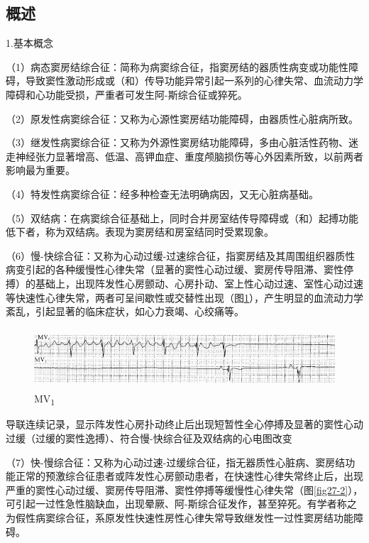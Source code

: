 \protect\hypertarget{text00034.htmlux5cux23subid409}{}{}

\subsection{概述}

1.基本概念

（1）病态窦房结综合征：简称为病窦综合征，指窦房结的器质性病变或功能性障碍，导致窦性激动形成或（和）传导功能异常引起一系列的心律失常、血流动力学障碍和心功能受损，严重者可发生阿-斯综合征或猝死。

（2）原发性病窦综合征：又称为心源性窦房结功能障碍，由器质性心脏病所致。

（3）继发性病窦综合征：又称为外源性窦房结功能障碍，多由心脏活性药物、迷走神经张力显著增高、低温、高钾血症、重度颅脑损伤等心外因素所致，以前两者影响最为重要。

（4）特发性病窦综合征：经多种检查无法明确病因，又无心脏病基础。

（5）双结病：在病窦综合征基础上，同时合并房室结传导障碍或（和）起搏功能低下者，称为双结病。表现为窦房结和房室结同时受累现象。

（6）慢-快综合征：又称为心动过缓-过速综合征，指窦房结及其周围组织器质性病变引起的各种缓慢性心律失常（显著的窦性心动过缓、窦房传导阻滞、窦性停搏）的基础上，出现阵发性心房颤动、心房扑动、室上性心动过速、室性心动过速等快速性心律失常，两者可呈间歇性或交替性出现（图\ref{fig27-1}），产生明显的血流动力学紊乱，引起显著的临床症状，如心力衰竭、心绞痛等。

\begin{figure}[!htbp]
 \centering
 \includegraphics[width=5.58333in,height=0.88542in]{./images/Image00456.jpg}
 \captionsetup{justification=centering}
 \caption{MV\textsubscript{1}}
 \label{fig27-1}
  \end{figure} 
导联连续记录，显示阵发性心房扑动终止后出现短暂性全心停搏及显著的窦性心动过缓（过缓的窦性逸搏）、符合慢-快综合征及双结病的心电图改变

（7）快-慢综合征：又称为心动过速-过缓综合征，指无器质性心脏病、窦房结功能正常的预激综合征患者或阵发性心房颤动患者，在快速性心律失常终止后，出现严重的窦性心动过缓、窦房传导阻滞、窦性停搏等缓慢性心律失常（图\ref{fig27-2}），可引起一过性急性脑缺血，出现晕厥、阿-斯综合征发作，甚至猝死。有学者称之为假性病窦综合征，系原发性快速性房性心律失常导致继发性一过性窦房结功能障碍。

